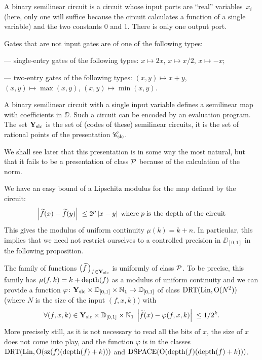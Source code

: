 \begin{definition}
\label{321}
A binary semilinear circuit is a circuit whose input ports are ``real'' variables~$x_i$ (here, only one will suffice because the circuit calculates a function of a single variable) and the two constants 0 and 1. There is only one output port.

\noindent 
Gates that are not input gates are of one of the following types:

\noindent 
--- single-entry gates of the following types: $x \mapsto 2x$, $x \mapsto x/2$, $x \mapsto -x$;

\noindent 
--- two-entry gates of the following types: 
$(x,y) \mapsto x + y$, $(x,y) \mapsto \max(x,y)$, $(x,y) \mapsto \min(x,y)$.

\noindent 
A binary semilinear circuit with a single input variable defines a semilinear map with coefficients in $\DD$. Such a circuit can be encoded by an evaluation program. The set ${{\bf Y}_{\rm slc}}$ is the set of (codes of these) semilinear circuits, it is the set of rational points of the presentation ${{{\mathscr C}}_{\rm slc}}$.
\end{definition}

We shall see later that this presentation is in some way the most natural, but that it fails to be a presentation of class ${\cal P}$ because of the calculation of the norm.

\noindent 
We have an easy bound of a Lipschitz modulus for the map defined by the circuit: 
\[
\left|{\widetilde{f}(x) - \widetilde{f}(y)}\right|\;  \leq 2^p \left|{ x- y}\right| \; 
{\rm where} \; p \; \hbox{is the depth of the circuit}
\]
This gives the modulus of uniform continuity $\mu(k) = k+n$. In particular, this implies that we need not restrict ourselves to a controlled precision in $\DD_{[0,1]}$ in the following proposition.
 
\begin{proposition} \label{322} 

\noindent 
The family of functions $\big(\widetilde{f}\,\big)_{f \in {{\bf Y}_{\rm slc}} }$ is uniformly of class ${\cal P}$. To be precise, this family has $\mu(f,k) = k+{\rm depth}(f)$ as a modulus of uniform continuity and we can provide a function $\varphi\colon {{\bf Y}_{\rm slc}} \times \mathbb {D}_{[0,1]} \times \mathbb {N}_1 \to \mathbb {D}_{[0,1]}$ of class ${\rm DRT}({\rm Lin}, {\rm O}(N^2))$ (where $N$ is the size of the input $(f,x,k)$) with 
\[
\forall (f, x, k) \in {{\bf Y}_{\rm slc}} \times \mathbb {D}_{[0,1]} \times \mathbb {N}_1 \;\left|{\widetilde{f}(x) - \varphi(f,x,k)}\right|\; \leq 1/2^k.
\]
More precisely still, as it is not necessary to read all the bits of $x$, the size of $x$ does not come into play, and the function $\varphi$ is in the classes ${\rm DRT}({\rm Lin}, {\rm O}({\rm sz}(f)({\rm depth}(f)+k)))$ and ${\rm DSPACE}({\rm O}({\rm depth}(f) ({\rm depth}(f)+k)))$.
\end{proposition}

